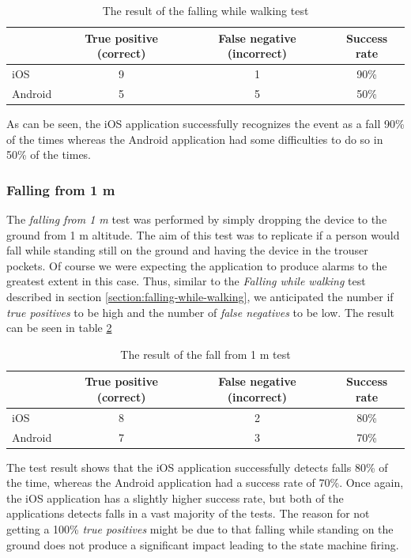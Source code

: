 \documentclass[12pt, a4paper, onecolumn]{article}
\begin{document}
	\begin{table}[H]
		\centering
		\begin{tabular}{|l|c|c|c|}
			\hline
			& True positive (correct) & False negative (incorrect) & Success rate \\ \hline
			iOS     & 9            & 1             & 90\%        \\ \hline
			Android & 5            & 5              & 50\%        \\ \hline
		\end{tabular}
		\caption{The result of the falling while walking test}
		\label{table:fall-while-walk}
	\end{table}
	
	As can be seen, the iOS application successfully recognizes the event as a fall 90\% of the times whereas the Android application had some difficulties to do so in 50\% of the times.
	
	
	\subsubsection{Falling from 1 m}
	\label{section:falling-from-1m}
	The  \textit{falling from 1 m} test was performed by simply dropping the device to the ground from 1 m altitude. The aim of this test was to replicate if a person would fall while standing still on the ground and having the device in the trouser pockets. Of course we were expecting the application to produce alarms to the greatest extent in this case. Thus, similar to the \textit{Falling while walking} test described in section \ref{section:falling-while-walking}, we anticipated the number if \textit{true positives} to be high and the number of \textit{false negatives} to be low. The result can be seen in table \ref{table:fall-from-1m}
	
	\begin{table}[H]
		\centering
		\begin{tabular}{|l|c|c|c|}
			\hline
			& True positive (correct) & False negative (incorrect) & Success rate \\ \hline
			iOS     & 8            & 2             & 80\%        \\ \hline
			Android & 7            & 3              & 70\%        \\ \hline
		\end{tabular}
		\caption{The result of the fall from 1 m test}
		\label{table:fall-from-1m}
	\end{table}
	
	The test result shows that the iOS application successfully detects falls 80\% of the time, whereas the Android application had a success rate of 70\%. Once again, the iOS application has a slightly higher success rate, but both of the applications detects falls in a vast majority of the tests. The reason for not getting a 100\% \textit{true positives} might be due to that falling while standing on the ground does not produce a significant impact leading to the state machine firing.
	
\end{document}

